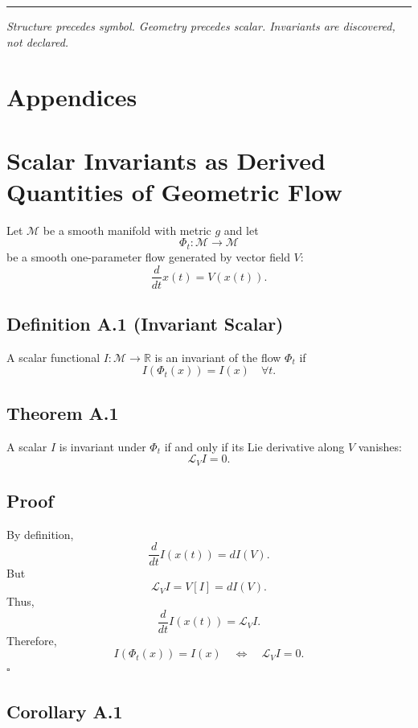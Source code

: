 \documentclass[12pt]{article}
\begin{document}
\bigskip
\hrule
\bigskip

\begin{center}
\small\itshape
Structure precedes symbol.  
Geometry precedes scalar.  
Invariants are discovered, not declared.
\end{center}

\newpage
\section*{Appendices}

\appendix

\section{Scalar Invariants as Derived Quantities of Geometric Flow}

Let $\mathcal{M}$ be a smooth manifold with metric $g$ and let 
\[
\Phi_t : \mathcal{M} \to \mathcal{M}
\]
be a smooth one-parameter flow generated by vector field $V$:
\[
\frac{d}{dt} x(t) = V(x(t)).
\]

\subsection*{Definition A.1 (Invariant Scalar)}

A scalar functional $I : \mathcal{M} \to \mathbb{R}$ is an invariant of the flow $\Phi_t$ if
\[
I(\Phi_t(x)) = I(x)
\quad \forall t.
\]

\subsection*{Theorem A.1}

A scalar $I$ is invariant under $\Phi_t$ if and only if its Lie derivative along $V$ vanishes:
\[
\mathcal{L}_V I = 0.
\]

\subsection*{Proof}

By definition,
\[
\frac{d}{dt} I(x(t)) = dI(V).
\]
But
\[
\mathcal{L}_V I = V[I] = dI(V).
\]
Thus,
\[
\frac{d}{dt} I(x(t)) = \mathcal{L}_V I.
\]
Therefore,
\[
I(\Phi_t(x)) = I(x)
\quad \Leftrightarrow \quad
\mathcal{L}_V I = 0.
\]
\hfill $\square$

\subsection*{Corollary A.1}
\end{document}
